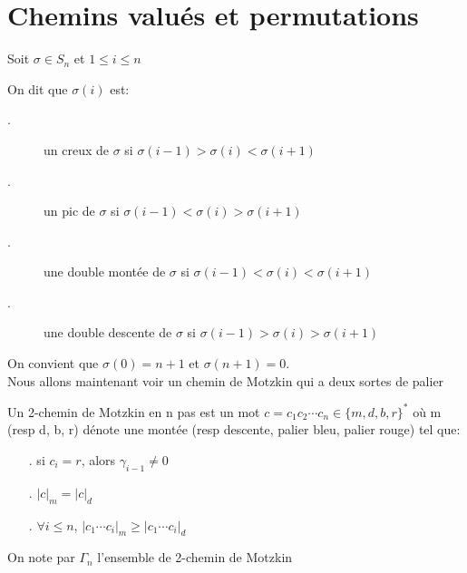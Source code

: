 	\section{Chemins valués et permutations}

		Soit $\sigma \in S_{n}$ et $1 \leq i \leq n$\\
		\begin{definition}
			\begin{rm}
				On dit que $\sigma(i)$ est: 
				\begin{description}
					\item[.] un creux de $\sigma$ si $\sigma (i-1)> \sigma (i)<\sigma (i+1)$
					\item[.] un pic de $\sigma$ si  $\sigma (i-1)<\sigma (i)>\sigma(i+1)$
					\item[.] une double montée de $\sigma$ si $\sigma (i-1)<\sigma (i)<\sigma(i+1)$
					\item[.] une double descente de $\sigma$ si  $\sigma (i-1)>\sigma (i)>\sigma(i+1)$ 
				\end{description}
			\end{rm}
		\end{definition}
		On convient que $\sigma (0) = n+1$ et $\sigma (n+1) = 0 $.\\
		Nous allons maintenant voir un chemin de Motzkin qui a deux sortes de palier

		\begin{definition}
			\begin{rm}
				Un 2-chemin de Motzkin en n pas est un mot $c = c_{1}c_{2}\cdots c_{n} \in \{m,d,b,r\}^{*}$ où m (resp d, b, r) dénote une montée (resp descente, palier bleu, palier rouge) tel que:
				\begin{itemize} 
					\item[.] si $c_{i}=r$, alors $\gamma_{i-1}\neq 0$
					\item[.] $|c|_{m}=|c|_{d}$
					\item[.] $\forall i \leq n$, $|c_{1}\cdots c_{i}|_{m}\geq |c_{1}\cdots c_{i}|_{d}$
				\end{itemize}
			\end{rm}
		\end{definition}
		On note par $\Gamma_{n}$ l'ensemble de 2-chemin de Motzkin

